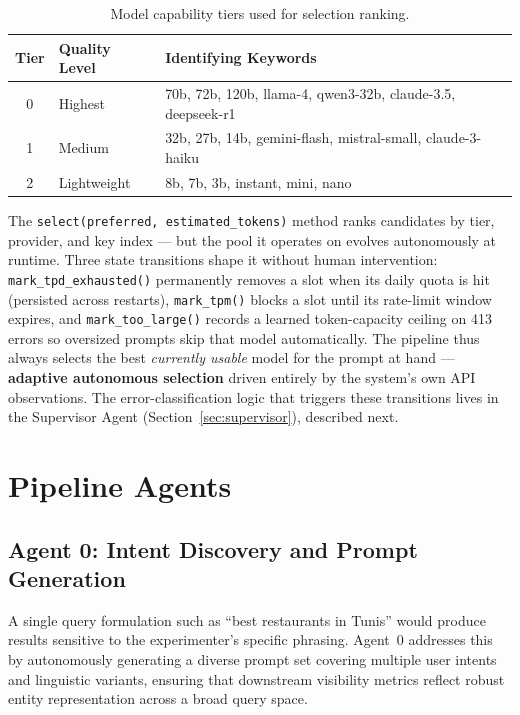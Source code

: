 \begin{table}[H]
\centering
\caption{Model capability tiers used for selection ranking.}
\label{tab:model_tiers}
\begin{tabular}{|c|p{3.2cm}|p{8.3cm}|}
\hline
\textbf{Tier} & \textbf{Quality Level} & \textbf{Identifying Keywords} \\
\hline
0 & Highest   & 70b, 72b, 120b, llama-4, qwen3-32b, claude-3.5, deepseek-r1 \\
\hline
1 & Medium    & 32b, 27b, 14b, gemini-flash, mistral-small, claude-3-haiku \\
\hline
2 & Lightweight & 8b, 7b, 3b, instant, mini, nano \\
\hline
\end{tabular}
\end{table}

The \texttt{select(preferred, estimated\_tokens)} method ranks candidates by tier,
provider, and key index --- but the pool it operates on evolves autonomously at
runtime. Three state transitions shape it without human intervention:
\texttt{mark\_tpd\_exhausted()} permanently removes a slot when its daily quota is
hit (persisted across restarts), \texttt{mark\_tpm()} blocks a slot until its
rate-limit window expires, and \texttt{mark\_too\_large()} records a learned
token-capacity ceiling on 413 errors so oversized prompts skip that model
automatically. The pipeline thus always selects the best \textit{currently usable}
model for the prompt at hand --- \textbf{adaptive autonomous selection} driven
entirely by the system's own API observations. The error-classification logic that
triggers these transitions lives in the Supervisor Agent
(Section~\ref{sec:supervisor}), described next.

\section{Pipeline Agents}

\subsection{Agent 0: Intent Discovery and Prompt Generation}

A single query formulation such as ``best restaurants in Tunis'' would produce
results sensitive to the experimenter's specific phrasing. Agent~0 addresses this
by autonomously generating a diverse prompt set covering multiple user intents and
linguistic variants, ensuring that downstream visibility metrics reflect robust
entity representation across a broad query space.

